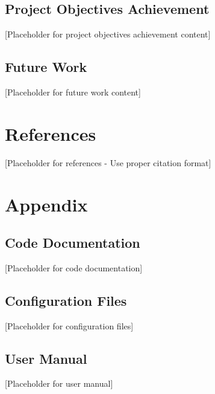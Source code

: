 \documentclass[12pt,a4paper]{article}
\begin{document}
\subsection{Project Objectives Achievement}


[Placeholder for project objectives achievement content]

\subsection{Future Work}


[Placeholder for future work content]

\section{References}


[Placeholder for references - Use proper citation format]

\section{Appendix}


\subsection{Code Documentation}


[Placeholder for code documentation]

\subsection{Configuration Files}


[Placeholder for configuration files]

\subsection{User Manual}


[Placeholder for user manual]
\end{document}
